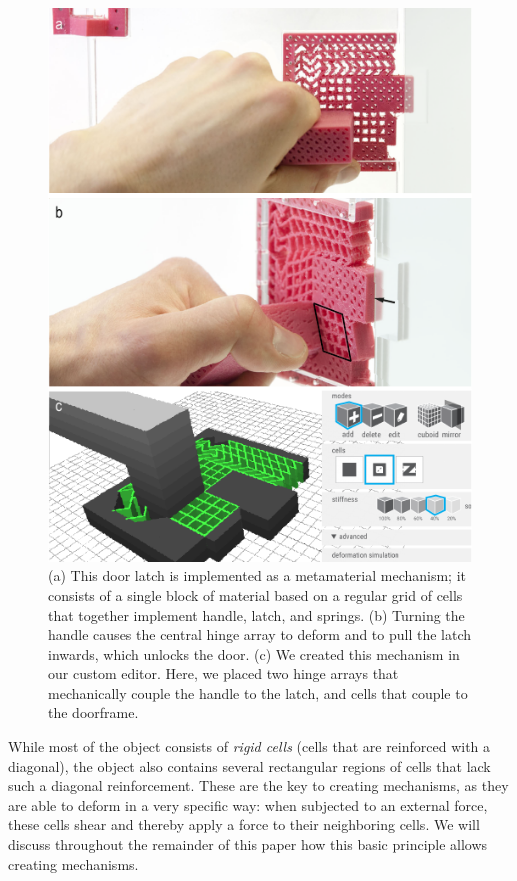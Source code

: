 \begin{figure}
    \includegraphics[width=\textwidth]{chapters/metamaterial-mechanisms-FIG/1-embedded-door-latch-figure1.pdf}
    \caption[Short figure name.]{(a) This door latch is implemented as a metamaterial mechanism; it consists of a single block of material based on a regular grid of cells that together implement handle, latch, and springs. (b) Turning the handle causes the central hinge array to deform and to pull the latch inwards, which unlocks the door. (c) We created this mechanism in our custom editor. Here, we placed two hinge arrays that mechanically couple the handle to the latch, and cells that couple to the doorframe.
    \label{fig:1 metanism-door latch}}
\end{figure}

While most of the object consists of \textit{rigid cells} (cells that are reinforced with a diagonal), the object also contains several rectangular regions of cells that lack such a diagonal reinforcement. These are the key to creating mechanisms, as they are able to deform in a very specific way: when subjected to an external force, these cells shear and thereby apply a force to their neighboring cells. We will discuss throughout the remainder of this paper how this basic principle allows creating mechanisms. 

